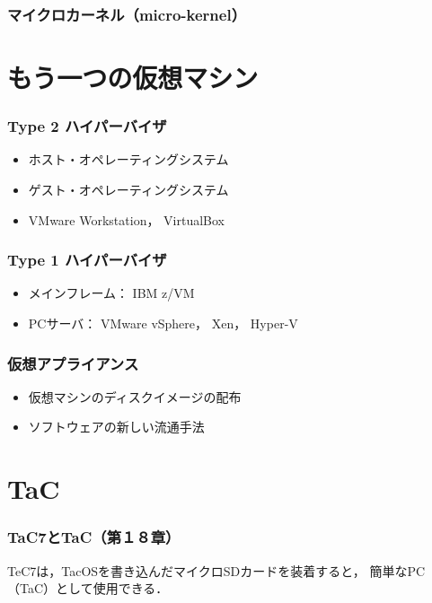 \documentclass[unicode]{beamer}                   %
\begin{document}
\begin{frame}
  \frametitle{マイクロカーネル（micro-kernel）}
\end{frame}

\section{もう一つの仮想マシン}
\begin{frame}
  \frametitle{Type 2 ハイパーバイザ}
  \begin{itemize}
  \item ホスト・オペレーティングシステム
  \item ゲスト・オペレーティングシステム
  \item VMware Workstation， VirtualBox
  \end{itemize}
\end{frame}

\begin{frame}
  \frametitle{Type 1 ハイパーバイザ}
  \begin{itemize}
  \item メインフレーム： IBM z/VM
  \item PCサーバ： VMware vSphere， Xen， Hyper-V
  \end{itemize}
\end{frame}

\begin{frame}
  \frametitle{仮想アプライアンス}
  \begin{itemize}
  \item 仮想マシンのディスクイメージの配布
  \item ソフトウェアの新しい流通手法
  \end{itemize}
\end{frame}

\section{TaC}
\begin{frame}
  \frametitle{TaC7とTaC（第１８章）}
  \begin{minipage}{0.58\columnwidth}
  \end{minipage}
  \begin{minipage}{0.38\columnwidth}
  \end{minipage}
\vfill
TeC7は，TacOSを書き込んだマイクロSDカードを装着すると，
簡単なPC（TaC）として使用できる．
\end{frame}
\end{document}
